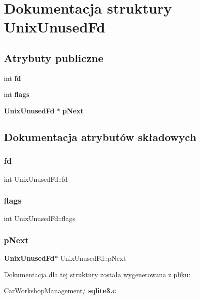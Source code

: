 \section{Dokumentacja struktury Unix\+Unused\+Fd}
\label{struct_unix_unused_fd}
\subsection*{Atrybuty publiczne}
\begin{DoxyCompactItemize}
\item 
int \textbf{ fd}
\item 
int \textbf{ flags}
\item 
\textbf{ Unix\+Unused\+Fd} $\ast$ \textbf{ p\+Next}
\end{DoxyCompactItemize}


\subsection{Dokumentacja atrybutów składowych}
\mbox{\label{struct_unix_unused_fd_a3f1a6127218af971aeb7b131c9c1600d}} 
\subsubsection{fd}
{\footnotesize\ttfamily int Unix\+Unused\+Fd\+::fd}

\mbox{\label{struct_unix_unused_fd_a744cd118bd91ec2019108e8205708684}} 
\subsubsection{flags}
{\footnotesize\ttfamily int Unix\+Unused\+Fd\+::flags}

\mbox{\label{struct_unix_unused_fd_a6bbcba75beeabdd2df126638bc1d8bc0}} 
\subsubsection{pNext}
{\footnotesize\ttfamily \textbf{ Unix\+Unused\+Fd}$\ast$ Unix\+Unused\+Fd\+::p\+Next}



Dokumentacja dla tej struktury została wygenerowana z pliku\+:\begin{DoxyCompactItemize}
\item 
Car\+Workshop\+Management/\textbf{ sqlite3.\+c}\end{DoxyCompactItemize}
